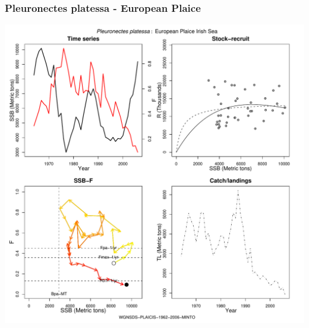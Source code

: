\subsubsection{Pleuronectes platessa - European Plaice}
\begin{center}
\includegraphics[width=1.2\textwidth]{../R/figures/WGNSDS-PLAICIS-1962-2006-MINTO.pdf}
\end{center}

